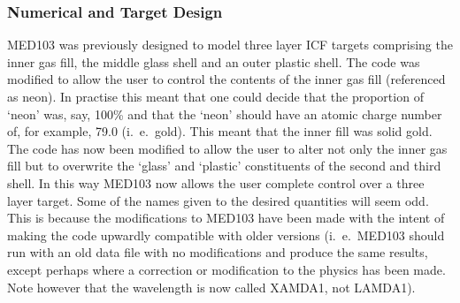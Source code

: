 \subsubsection{\bf Numerical and Target Design}
\newline
MED103 was previously designed to model three layer ICF targets
comprising the inner gas
fill, the middle glass shell and an outer plastic shell. The code was
modified to allow the user to control the contents of the inner gas fill
(referenced as neon). In practise this meant that one could decide that
the proportion of `neon' was, say, 100\% and that the `neon' should have
an atomic charge number of, for example, 79.0 (i.\ e.\ gold). This meant
that the inner fill was solid gold. The code has now been modified to
allow the user to alter not only the inner gas fill but to overwrite the
`glass' and `plastic' constituents of the second and third shell. In
this way MED103 now allows the user complete control over a three layer
target. Some of the names given to the desired quantities will seem odd.
This is because the modifications to MED103 have been made with the
intent of making the code upwardly
compatible with older versions (i.\ e.\
MED103 should run with an old data file with no modifications and
produce the same results, except perhaps where a correction or
modification to the physics has been made. Note however that the
wavelength is now called XAMDA1, not LAMDA1).
